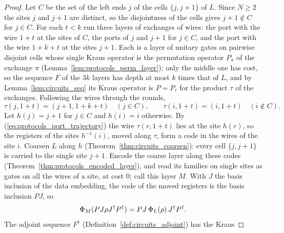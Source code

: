 \begin{proof}\leanok
    Let $C$ be the set of the left ends $j$ of the cells $\{j,j+1\}$ of $L$. Since $N\ge2$ the
    sites $j$ and $j+1$ are distinct, so the disjointness of the cells gives $j+1\notin C$ for
    $j\in C$. For each $t<k$ run three layers of exchanges of wires: the port with the wire
    $1+t$ at the sites of $C$, the ports of $j$ and $j+1$ for $j\in C$, and the port with the
    wire $1+k+t$ at the sites $j+1$. Each is a layer of unitary gates on pairwise disjoint
    cells whose single Kraus operator is the permutation operator $P_\pi$ of the exchange $\pi$
    (Lemma~\ref{lem:protocols_perm_layer});
    only the middle one has cost, so the sequence $F$ of the $3k$ layers has depth at most $k$
    times that of $L$, and by Lemma~\ref{lem:circuits_seq} its Kraus operator is $P=P_\tau$
    for the product $\tau$ of the exchanges. Following the wires through the rounds,
    \begin{equation}
        \tau(j,1+t)=(j+1,1+k+t)\quad(j\in C),\qquad\tau(i,1+t)=(i,1+t)\quad(i\notin C).
        \label{eq:protocols_port_trajectory}
    \end{equation}
    Let $h(j)=j+1$ for $j\in C$ and $h(i)=i$ otherwise. By
    (\ref{eq:protocols_port_trajectory}) the wire $\tau(r,1+t)$ lies at the site $h(r)$, so
    the registers of the sites $h^{-1}(i)$, moved along $\tau$, form a code in the wires of
    the site $i$. Coarsen $L$ along $h$ (Theorem~\ref{thm:circuits_coarsen}): every cell
    $\{j,j+1\}$ is carried to the single site $j+1$. Encode the coarse layer along these codes
    (Theorem~\ref{thm:protocols_encoded_layer}), and read its families on single sites as gates
    on all the wires of a site, at cost $0$; call this layer $M$. With $J$ the basis inclusion
    of the data embedding, the code of the moved registers is the basis inclusion $PJ$, so
    \begin{equation}
        \Phi_M(PJ\rho J^\dagger P^\dagger)=PJ\,\Phi_L(\rho)\,J^\dagger P^\dagger.
        \notag
    \end{equation}
    The adjoint sequence $F^\dagger$ (Definition~\ref{def:circuits_adjoint}) has the Kraus

\end{proof}
